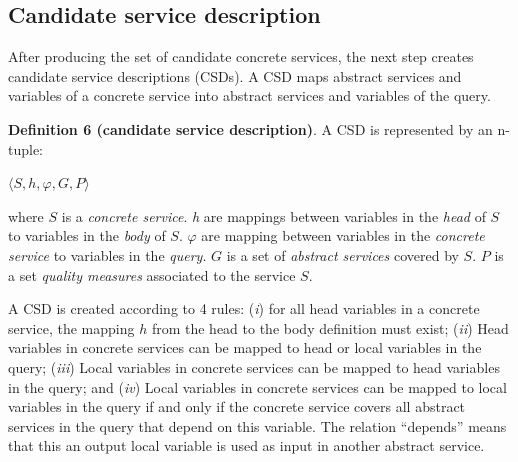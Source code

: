 

\subsection{Candidate service description}

After producing the set of candidate concrete services, the next step 
creates candidate service descriptions (CSDs). 
A CSD maps abstract services and variables of a concrete service into abstract 
services and variables of the query. 

\noindent \textbf{Definition 6 (candidate service description)}.
A CSD is represented by an n-tuple:
\begin{center}
$\langle S, h, \varphi, G, P\rangle$
\end{center}
where $S$ is a \textit{concrete service}. 
\textit{h} are mappings between variables in the \textit{head} of $S$ to variables in the \textit{body} of $S$. 
$\varphi$ are mapping between variables in the \textit{concrete service} to variables in the \textit{query}.
$G$ is a set of \textit{abstract services} covered by $S$. 
$P$ is a set \textit{quality measures} associated to the service $S$. 
 
A CSD is created according to 4 rules: (\textit{i}) for all head variables in a
concrete service, the mapping $h$ from the head to the body definition must
exist; (\textit{ii}) Head variables in concrete services can be mapped to head
or local variables in the query; (\textit{iii}) Local variables in concrete
services can be mapped to head variables in the query; and (\textit{iv}) Local
variables in concrete services can be mapped to local variables in the query if and only if the concrete service covers all abstract services in the query that depend on this variable. The relation ``depends''  means that this an output local variable is used as input in another abstract service.

